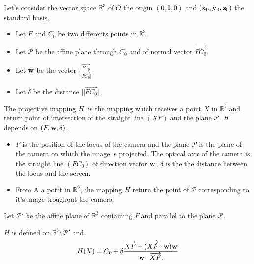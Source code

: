 Let's consider the vector space $\mathbb{R}^{3}$  of $O$ the origin $(0,0,0)$  and $(\mathbf{x}_0,\mathbf{y}_0,\mathbf{z}_0)$ the standard basis.
\begin{itemize}
\item Let $F$ and $C_0$ be two differents points in $\mathbb{R}^{3}$.
\item Let $\mathcal{P}$ be the affine plane through $C_0$ and of normal vector $\overrightarrow{FC_0}$.
\item Let $\mathbf{w}$ be the vector $\frac{\overrightarrow{FC_0}}{|| \overrightarrow{FC_0}||}$
\item Let $\delta$ be the distance $|| \overrightarrow{FC_0}||$
\end{itemize}
\begin{Def}
The projective mapping $H$, is the mapping which receives a point $X$ in $\mathbb{R}^{3}$ and return point of intersection of the straight line $(XF)$ and the plane $\mathcal{P}$. $H$ depends on $(F,\mathbf{w},\delta)$.
\end{Def}
\begin{remarques}
\begin{itemize}
\item $F$ is the position of the focus of the camera and the plane $\mathcal{P}$ is the plane of the camera on which the image is projected. The optical axis of the camera is the straight line $(FC_0)$ of direction vector $\mathbf{w}$, $\delta$ is the the distance between the focus and the screen.
\item From A a point in $\mathbb{R}^3$, the mapping $H$ return the point of $\mathcal{P}$ corresponding to it's image troughout the camera.
\end{itemize}
\end{remarques}
Let $\mathcal{P}'$ be the affine plane of $\mathbb{R}^{3}$ containing $F$ and parallel to the plane $\mathcal{P}$.
\begin{lem}
$H$ is defined on $\mathbb{R}^3 \setminus \mathcal{P}'$ and,
\begin{equation}
H(X) = C_0 +  \delta \frac{\overrightarrow{XF}-(\overrightarrow{XF}\cdot \mathbf{w} )\mathbf{w}}{\mathbf{w} \cdot \overrightarrow{XF}.} 
\label{formul_lem_app_proj}
\end{equation}
\label{lem_app_proj}
\end{lem}
